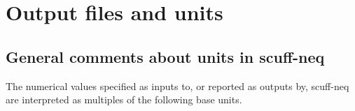 \documentclass[letterpaper]{article}
\begin{document}

\newpage
\section{Output files and units}

\subsection{General comments about units in {\sc scuff-neq}}

The numerical values specified as inputs to, or reported
as outputs by, {\sc scuff-neq} are interpreted as multiples
of the following base units.
\end{document}
